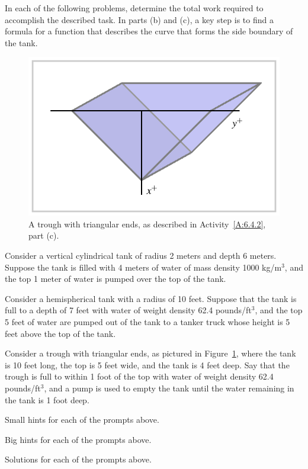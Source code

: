 \begin{activity} \label{A:6.4.2}  In each of the following problems, determine the total work required to accomplish the described task.  In parts (b) and (c), a key step is to find a formula for a function that describes the curve that forms the side boundary of the tank.
\begin{figure}[h]
\begin{center}
\includegraphics{figures/6_4_Act2Trough.eps}
\caption{A trough with triangular ends, as described in Activity~\ref{A:6.4.2}, part (c).} \label{F:6.4.Act2Trough}
\end{center}
\end{figure}
\ba
	\item Consider a vertical cylindrical tank of radius 2 meters and depth 6 meters.  Suppose the tank is filled with 4 meters of water of mass density 1000 kg/m$^3$, and the top 1 meter of water is pumped over the top of the tank.
	\item Consider a hemispherical tank with a radius of 10 feet.  Suppose that the tank is full to a depth of 7 feet with water of weight density 62.4 pounds/ft$^3$, and the top 5 feet of water are pumped out of the tank to a tanker truck whose height is 5 feet above the top of the tank.
	\item Consider a trough with triangular ends, as pictured in Figure~\ref{F:6.4.Act2Trough}, where the tank is 10 feet long, the top is 5 feet wide, and the tank is 4 feet deep.  Say that the trough is full to within 1 foot of the top with water of weight density 62.4 pounds/ft$^3$, and a pump is used to empty the tank until the water remaining in the tank is 1 foot deep.
\ea

\end{activity}
\begin{smallhint}
\ba
	\item Small hints for each of the prompts above.
\ea
\end{smallhint}
\begin{bighint}
\ba
	\item Big hints for each of the prompts above.
\ea
\end{bighint}
\begin{activitySolution}
\ba
	\item Solutions for each of the prompts above.
\ea
\end{activitySolution}
\aftera